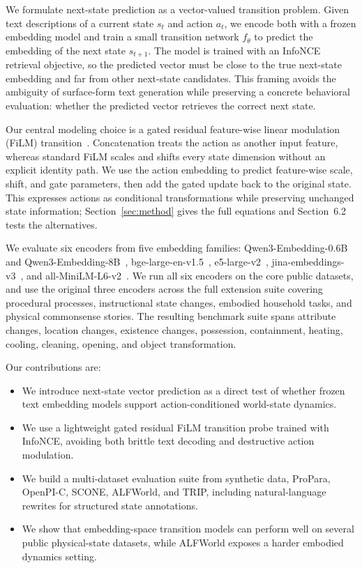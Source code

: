 \documentclass{article}
\begin{document}
We formulate next-state prediction as a vector-valued transition problem. Given text descriptions of a current state $s_t$ and action $a_t$, we encode both with a frozen embedding model and train a small transition network $f_\theta$ to predict the embedding of the next state $s_{t+1}$. The model is trained with an InfoNCE retrieval objective, so the predicted vector must be close to the true next-state embedding and far from other next-state candidates. This framing avoids the ambiguity of surface-form text generation while preserving a concrete behavioral evaluation: whether the predicted vector retrieves the correct next state.

Our central modeling choice is a gated residual feature-wise linear modulation (FiLM) transition~\citep{perez2017film}. Concatenation treats the action as another input feature, whereas standard FiLM scales and shifts every state dimension without an explicit identity path. We use the action embedding to predict feature-wise scale, shift, and gate parameters, then add the gated update back to the original state. This expresses actions as conditional transformations while preserving unchanged state information; Section~\ref{sec:method} gives the full equations and Section~6.2 tests the alternatives.

We evaluate six encoders from five embedding families: Qwen3-Embedding-0.6B and Qwen3-Embedding-8B~\citep{zhang2025qwen3embedding}, bge-large-en-v1.5~\citep{xiao2024cpack}, e5-large-v2~\citep{wang2022e5}, jina-embeddings-v3~\citep{sturua2024jinaembeddingsv3}, and all-MiniLM-L6-v2~\citep{huggingfaceAllMiniLML6V2,wang2020minilm}. We run all six encoders on the core public datasets, and use the original three encoders across the full extension suite covering procedural processes, instructional state changes, embodied household tasks, and physical commonsense stories. The resulting benchmark suite spans attribute changes, location changes, existence changes, possession, containment, heating, cooling, cleaning, opening, and object transformation.

Our contributions are:
\begin{itemize}
  \item We introduce next-state vector prediction as a direct test of whether frozen text embedding models support action-conditioned world-state dynamics.
  \item We use a lightweight gated residual FiLM transition probe trained with InfoNCE, avoiding both brittle text decoding and destructive action modulation.
\item We build a multi-dataset evaluation suite from synthetic data, ProPara, OpenPI-C, SCONE, ALFWorld, and TRIP, including natural-language rewrites for structured state annotations.
  \item We show that embedding-space transition models can perform well on several public physical-state datasets, while ALFWorld exposes a harder embodied dynamics setting.
\end{itemize}
\end{document}
